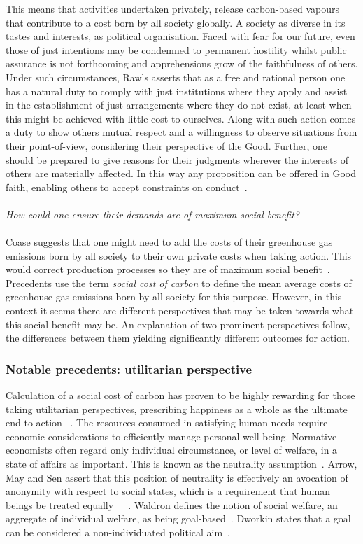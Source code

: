 \documentclass[11pt, oneside]{book}   	%
\begin{document}
This means that activities undertaken privately, release carbon-based vapours that contribute to a cost born by all society globally.
A society as diverse in its tastes and interests, as political organisation.
Faced with fear for our future, even those of just intentions may be condemned to permanent hostility whilst public assurance is not forthcoming and apprehensions grow of the faithfulness of others.
Under such circumstances, Rawls asserts that as a free and rational person one has a natural duty to comply with just institutions where they apply and assist in the establishment of just arrangements where they do not exist, at least when this might be achieved with little cost to ourselves.
Along with such action comes a duty to show others mutual respect and a willingness to observe situations from their point-of-view, considering their perspective of the Good.
Further, one should be prepared to give reasons for their judgments wherever the interests of others are materially affected. In this way any proposition can be offered in Good faith, enabling others to accept constraints on conduct~\cite{jr1}.\\
\\
 \emph{How could one ensure their demands are of maximum social benefit?}\\
 \\
Coase suggests that one might need to add the costs of their greenhouse gas emissions born by all society to their own private costs when taking action.
This would correct production processes so they are of maximum social benefit~\cite{rc1}.
Precedents use the term \emph{social cost of carbon} to define the mean average costs of greenhouse gas emissions born by all society for this purpose.
However, in this context it seems there are different perspectives that may be taken towards what this social benefit may be.
An explanation of two prominent perspectives follow, the differences between them yielding significantly different outcomes for action.

\subsubsection{Notable precedents: utilitarian perspective}

Calculation of a social cost of carbon has proven to be highly rewarding for those taking utilitarian perspectives, prescribing happiness as a whole as the ultimate end to action ~\cite{hs1}. The resources consumed in satisfying human needs require economic considerations to efficiently manage personal well-being. Normative economists often regard only individual circumstance, or level of  welfare, in a state of affairs as important. This is known as the neutrality assumption~\cite{pd2}. Arrow, May and Sen assert that this position of neutrality is effectively an avocation of anonymity with respect to social states, which is a requirement that human beings be treated equally~\cite{ka1}~\cite{km1}~\cite{as2}. Waldron defines the notion of social welfare, an aggregate of individual welfare, as being goal-based~\cite{jw2}. Dworkin states that a goal can be considered a non-individuated political aim~\cite{rd1}.
\end{document}

